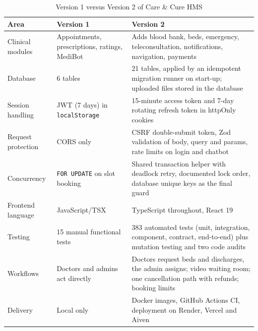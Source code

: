 \begin{table}[H]
\centering
\caption{Version 1 versus Version 2 of Care \& Cure HMS}
\label{tab:enhancements}
\renewcommand{\arraystretch}{1.25}
\begin{tabular}{|L{3.6cm}|L{4.6cm}|L{5.4cm}|}
\hline
{}
\textbf{Area} & \textbf{Version 1} & \textbf{Version 2} \\
\hline
Clinical modules & Appointments, prescriptions, ratings, MediBot & Adds blood bank, beds, emergency, teleconsultation, notifications, navigation, payments \\
\hline
Database & 6 tables & 21 tables, applied by an idempotent migration runner on start-up; uploaded files stored in the database \\
\hline
Session handling & JWT (7 days) in \texttt{localStorage} & 15-minute access token and 7-day rotating refresh token in httpOnly cookies \\
\hline
Request protection & CORS only & CSRF double-submit token, Zod validation of body, query and params, rate limits on login and chatbot \\
\hline
Concurrency & \texttt{FOR UPDATE} on slot booking & Shared transaction helper with deadlock retry, documented lock order, database unique keys as the final guard \\
\hline
Frontend language & JavaScript/TSX & TypeScript throughout, React 19 \\
\hline
Testing & 15 manual functional tests & 383 automated tests (unit, integration, component, contract, end-to-end) plus mutation testing and two code audits \\
\hline
Workflows & Doctors and admins act directly & Doctors request beds and discharges, the admin assigns; video waiting room; one cancellation path with refunds; booking limits \\
\hline
Delivery & Local only & Docker images, GitHub Actions CI, deployment on Render, Vercel and Aiven \\
\hline
\end{tabular}
\end{table}
